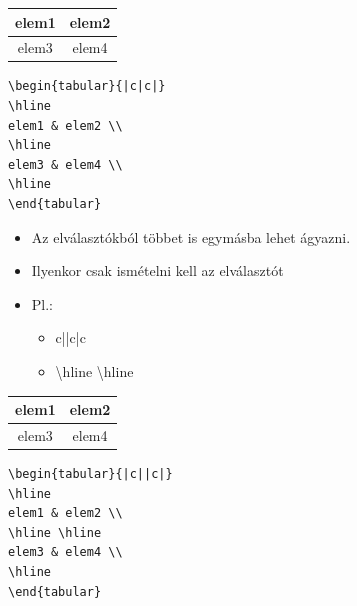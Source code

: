 \documentclass[11pt]{beamer}
\newcommand{\tbs}{\textbackslash}
\begin{document}
\begin{frame}[fragile]
\begin{center}
\begin{tabular}{|c|c|}
\hline 
elem1 & elem2 \\ 
\hline 
elem3 & elem4 \\ 
\hline 
\end{tabular} 
\end{center}
\vspace{2cm}
\begin{verbatim}
\begin{tabular}{|c|c|}
\hline 
elem1 & elem2 \\ 
\hline 
elem3 & elem4 \\ 
\hline 
\end{tabular}
\end{verbatim}
\end{frame}

\begin{frame}[fragile]
\begin{itemize}
\item	Az elválasztókból többet is egymásba lehet ágyazni.
\item	Ilyenkor csak ismételni kell az elválasztót
\item	Pl.:
		\begin{itemize}
		\item	c||c|c
		\item	\tbs hline \tbs hline
		\end{itemize}
\end{itemize}
\vspace{10px}
\begin{center}
\begin{tabular}{|c||c|}
\hline 
elem1 & elem2 \\ 
\hline \hline
elem3 & elem4 \\ 
\hline 
\end{tabular} 
\end{center}
\vspace{10px}
\begin{verbatim}
\begin{tabular}{|c||c|}
\hline 
elem1 & elem2 \\ 
\hline \hline
elem3 & elem4 \\ 
\hline 
\end{tabular}
\end{verbatim}
\end{frame}
\end{document}
